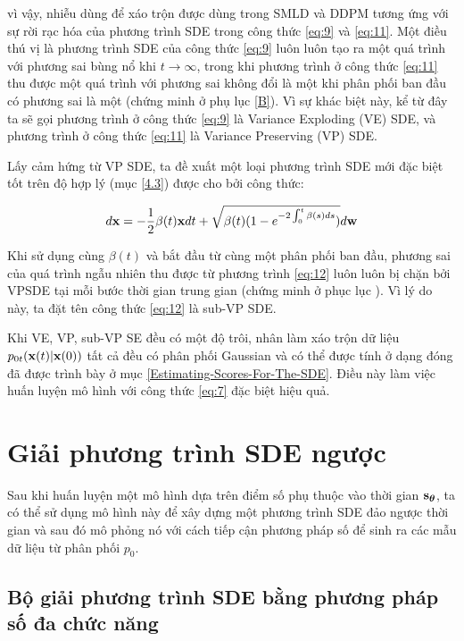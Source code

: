\documentclass{article} %
\begin{document}
vì vậy, nhiễu dùng để xáo trộn được dùng trong SMLD và DDPM tương ứng với sự rời rạc hóa của phương trình SDE trong công thức \ref{eq:9} và \ref{eq:11}.
Một điều thú vị là phương trình SDE của công thức \ref{eq:9} luôn luôn tạo ra một quá trình với phương sai bùng nổ khi $t \rightarrow \infty$, trong khi phương trình ở công thức \ref{eq:11} thu được một quá trình với phương sai không đổi là một khi phân phối ban đầu có phương sai là một (chứng minh ở phụ lục \ref{B}).
Vì sự khác biệt này, kể từ đây ta sẽ gọi phương trình ở công thức \ref{eq:9} là Variance Exploding (VE) SDE, và phương trình ở công thức \ref{eq:11} là Variance Preserving (VP) SDE.

Lấy cảm hứng từ VP SDE, ta đề xuất một loại phương trình SDE mới đặc biệt tốt trên độ hợp lý (mục \ref{4.3}) được cho bởi công thức:

\begin{equation} \label{eq:12}
    d \bold{x} = -\dfrac{1}{2} \beta(t) \bold{x} dt + \sqrt{\beta(t) (1-e^{-2\int_{0}^{t} \beta(s)ds} )} d \bold{w}
\end{equation}

Khi sử dụng cùng $\beta(t)$ và bắt đầu từ cùng một phân phối ban đầu, phương sai của quá trình ngẫu nhiên thu được từ phương trình \ref{eq:12} luôn luôn bị chặn bởi VPSDE tại mỗi bước thời gian trung gian (chứng minh ở phục lục ).
Vì lý do này, ta đặt tên công thức \ref{eq:12} là sub-VP SDE.

Khi VE, VP, sub-VP SE đều có một độ trôi, nhân làm xáo trộn dữ liệu $p_{0t}(\bold{x}(t) \vert \bold{x}(0))$ tất cả đều có phân phối Gaussian và có thể được tính ở dạng đóng đã được trình bày ở mục \ref{Estimating-Scores-For-The-SDE}.
Điều này làm việc huấn luyện mô hình với công thức \ref{eq:7} đặc biệt hiệu quả.

\section{Giải phương trình SDE ngược}

Sau khi huấn luyện một mô hình dựa trên điểm số phụ thuộc vào thời gian $\bold{s}_{\boldsymbol{\theta}}$, ta có thể sử dụng mô hình này để xây dựng một phương trình SDE đảo ngược thời gian và sau đó mô phỏng nó với cách tiếp cận phương pháp số để sinh ra các mẫu dữ liệu từ phân phối $p_0$.

\subsection{Bộ giải phương trình SDE bằng phương pháp số đa chức năng}
\end{document}
